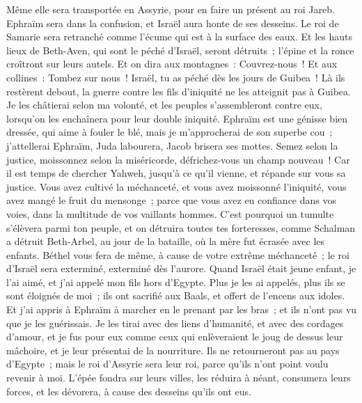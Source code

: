 \begin{multicols}{2}
Même elle sera transportée en Assyrie, pour en faire un présent au roi Jareb. Ephraïm sera dans la confusion, et Israël aura honte de ses desseins.
Le roi de Samarie sera retranché comme l'écume qui est à la surface des eaux.
Et les hauts lieux de Beth-Aven, qui sont le péché d'Israël, seront détruits~; l'épine et la ronce croîtront sur leurs autels. Et on dira aux montagnes~: Couvrez-nous~! Et aux collines~: Tombez sur nous~!
Israël, tu as péché dès les jours de Guibea~! Là ils restèrent debout, la guerre contre les fils d'iniquité ne les atteignit pas à Guibea.
Je les châtierai selon ma volonté, et les peuples s'assembleront contre eux, lorsqu'on les enchaînera pour leur double iniquité.
Ephraïm est une génisse bien dressée, qui aime à fouler le blé, mais je m'approcherai de son superbe cou~; j'attellerai Ephraïm, Juda labourera, Jacob brisera ses mottes.
Semez selon la justice, moissonnez selon la miséricorde, défrichez-vous un champ nouveau~! Car il est temps de chercher Yahweh, jusqu'à ce qu'il vienne, et répande sur vous sa justice.
Vous avez cultivé la méchanceté, et vous avez moissonné l'iniquité, vous avez mangé le fruit du mensonge~; parce que vous avez eu confiance dans vos voies, dans la multitude de vos vaillants hommes.
C'est pourquoi un tumulte s'élèvera parmi ton peuple, et on détruira toutes tes forteresses, comme Schalman a détruit Beth-Arbel, au jour de la bataille, où la mère fut écrasée avec les enfants.
Béthel vous fera de même, à cause de votre extrême méchanceté~; le roi d'Israël sera exterminé, exterminé dès l'aurore.
\VerseOne{}Quand Israël était jeune enfant, je l'ai aimé, et j'ai appelé mon fils hors d'Egypte.
Plus je les ai appelés, plus ils se sont éloignés de moi~; ils ont sacrifié aux Baals, et offert de l'encens aux idoles.
Et j'ai appris à Ephraïm à marcher en le prenant par les bras~; et ils n'ont pas vu que je les guérissais.
Je les tirai avec des liens d'humanité, et avec des cordages d'amour, et je fus pour eux comme ceux qui enlèveraient le joug de dessus leur mâchoire, et je leur présentai de la nourriture.
Ils ne retourneront pas au pays d'Egypte~; mais le roi d'Assyrie sera leur roi, parce qu'ils n'ont point voulu revenir à moi.
L'épée fondra sur leurs villes, les réduira à néant, consumera leurs forces, et les dévorera, à cause des desseins qu'ils ont eus.

\end{multicols}
